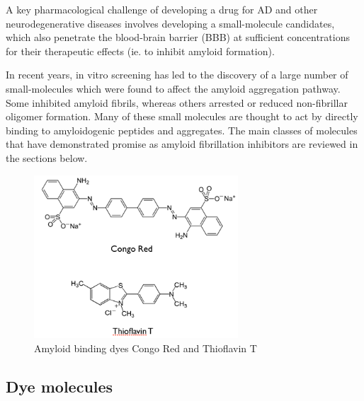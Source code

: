 
A key pharmacological challenge of developing a drug for AD and other neurodegenerative diseases involves developing a small-molecule candidates, which also penetrate the blood-brain barrier (BBB) at sufficient concentrations for their therapeutic effects (ie. to inhibit amyloid formation). %

In recent years, in vitro screening has led to the discovery of a large number of small-molecules which were found to affect the amyloid aggregation pathway. Some inhibited amyloid fibrils, whereas others arrested or reduced non-fibrillar oligomer formation. Many of these small molecules are thought to act by directly binding to amyloidogenic peptides and aggregates. The main classes of molecules that have demonstrated promise as amyloid fibrillation inhibitors are reviewed in the sections below.

\begin{figure}
\centering
\includegraphics[width=3in]{figures/introduction/dyes.png}
\caption[Small molecule binders]{Amyloid binding dyes Congo Red and Thioflavin T}
\label{fig:amyloid_dyes}
\end{figure}

\subsection{Dye molecules}

